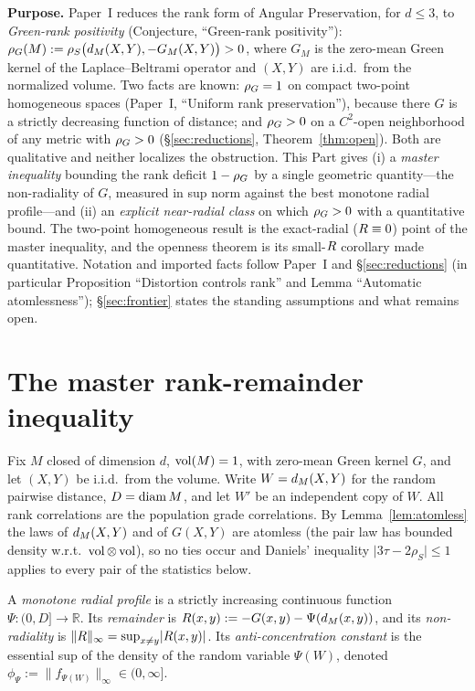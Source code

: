 
\noindent\textbf{Purpose.} Paper~I reduces the rank form of Angular Preservation, for
$d\le3$, to \emph{Green-rank positivity} (Conjecture, ``Green-rank positivity''):
$\rho_G(M):=\rho_S\bigl(d_M(X,Y),-G_M(X,Y)\bigr)>0$, where $G_M$ is the zero-mean Green
kernel of the Laplace--Beltrami operator and $(X,Y)$ are i.i.d.\ from the normalized
volume. Two facts are known: $\rho_G=1$ on compact two-point homogeneous spaces
(Paper~I, ``Uniform rank preservation''), because there $G$ is a strictly decreasing
function of distance; and $\rho_G>0$ on a $C^2$-open neighborhood of any metric with
$\rho_G>0$ (\S\ref{sec:reductions}, Theorem~\ref{thm:open}). Both are qualitative and neither
localizes the obstruction. This Part gives (i) a \emph{master inequality} bounding the
rank deficit $1-\rho_G$ by a single geometric quantity---the non-radiality of $G$,
measured in sup norm against the best monotone radial profile---and (ii) an
\emph{explicit near-radial class} on which $\rho_G>0$ with a quantitative bound. The
two-point homogeneous result is the exact-radial ($R\equiv0$) point of the master
inequality, and the openness theorem is its small-$R$ corollary made quantitative.
Notation and imported facts follow Paper~I and \S\ref{sec:reductions} (in
particular Proposition ``Distortion controls rank'' and Lemma ``Automatic
atomlessness''); §\ref{sec:frontier} states the standing assumptions and what remains
open.

\section{The master rank-remainder inequality}

Fix $M$ closed of dimension $d$, $\operatorname{vol}(M)=1$, with zero-mean Green kernel $G$, and let
$(X,Y)$ be i.i.d.\ from the volume. Write $W=d_M(X,Y)$ for the random pairwise distance,
$D=\operatorname{diam} M$, and let $W'$ be an independent copy of $W$. All rank correlations are the
population grade correlations. By Lemma~\ref{lem:atomless} the
laws of $d_M(X,Y)$ and of $G(X,Y)$ are atomless (the pair law has bounded density
w.r.t.\ $\operatorname{vol}\otimes\operatorname{vol}$), so no ties occur and Daniels' inequality
$\lvert3\tau-2\rho_S\rvert\le1$ applies to every pair of the statistics below.

\begin{definition}
A \emph{monotone radial profile} is a strictly increasing continuous function
$\Psi:(0,D]\to\mathbb R$. Its \emph{remainder} is $R(x,y):=-G(x,y)-\Psi(d_M(x,y))$,
and its \emph{non-radiality} is $\lVert R\rVert_\infty=\sup_{x\ne y}\lvert R(x,y)\rvert$.
Its \emph{anti-concentration constant} is the essential sup of the density of the random
variable $\Psi(W)$, denoted $\phi_\Psi:=\lVert f_{\Psi(W)}\rVert_\infty\in(0,\infty]$.
\end{definition}

